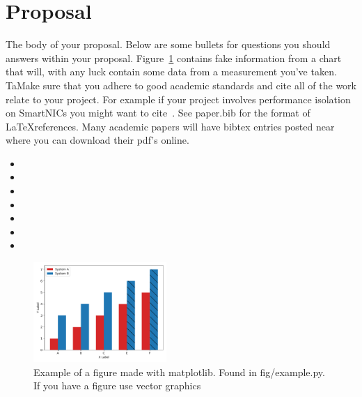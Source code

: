 \section{Proposal}

The body of your proposal. Below are some bullets for questions you should
answers within your proposal. Figure~\ref{fig:example} contains fake information
from a chart that will, with any luck contain some data from a measurement
you've taken. TaMake sure that you adhere to good academic standards and cite all
of the work relate to your project. For example if your project involves
performance isolation on SmartNICs you might want to cite~\cite{fairnic}. See
paper.bib for the format of \LaTeX references. Many academic papers will have
bibtex entries posted near where you can download their pdf's online.


\begin{itemize}
    \item{}
    \item{}
    \item{}
    \item{}
    \item{}
    \item{}
    \item{}
\end{itemize}

\begin{figure}[H]
    \includegraphics[width=0.45\textwidth]{fig/example.pdf}
    \caption{Example of a figure made with matplotlib. Found in fig/example.py. If you have a figure use vector graphics}
    \label{fig:example}
    \vspace*{-10.00mm}
\end{figure}


